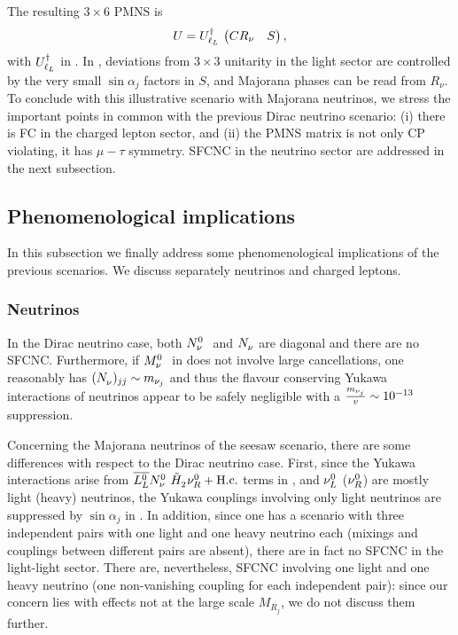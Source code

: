 \documentclass[12pt,a4paper]{article}
\begin{document}
The resulting $3\times 6$ PMNS is
\begin{equation}\label{eq:PMNS:Majorana}
 U=U_{\ell_L}^{\dagger}\,\begin{pmatrix}CR_\nu & S\end{pmatrix},
\end{equation}
with $U_{\ell_L}^{\dagger}$ in . In , deviations from $3\times 3$ unitarity in the light sector are controlled by the very small $\sin\alpha_j$ factors in $S$, and Majorana phases can be read from $R_\nu$. To conclude with this illustrative scenario with Majorana neutrinos, we stress the important points in common with the previous Dirac neutrino scenario: (i) there is FC in the charged lepton sector, and (ii) the PMNS matrix is not only CP violating, it has $\mu-\tau$ symmetry. SFCNC in the neutrino sector are addressed in the next subsection.

\subsection{Phenomenological implications\label{sSEC:Pheno}}
In this subsection we finally address some phenomenological implications of the previous scenarios. We discuss separately neutrinos and charged leptons.

\subsubsection{Neutrinos\label{ssSEC:Neutrinos}}
In the Dirac neutrino case, both $\wNN$ and $\mNN$ are diagonal and there are no SFCNC. Furthermore, if $\wMN$ in  does not involve large cancellations, one reasonably has $(\mNN)_{jj}\sim m_{\nu_j}$ and thus the flavour conserving Yukawa interactions of neutrinos appear to be safely negligible with a $\frac{m_{\nu_j}}{v_{}}\sim 10^{-13}$ suppression.

Concerning the Majorana neutrinos of the seesaw scenario, there are some differences with respect to the Dirac neutrino case. First, since the Yukawa interactions arise from $\wLLb\wNN\HSDC{2}\wNR+\Hc$ terms in , and $\nu_L^0$ ($\nu_R^0$) are mostly light (heavy) neutrinos, the Yukawa couplings involving only light neutrinos are suppressed by $\sin\alpha_j$ in . In addition, since one has a scenario with three independent pairs with one light and one heavy neutrino each (mixings and couplings between different pairs are absent), there are in fact no SFCNC in the light-light sector. There are, nevertheless, SFCNC involving one light and one heavy neutrino (one non-vanishing coupling for each independent pair): since our concern lies with effects not at the large scale $M_{R_j}$, we do not discuss them further.
\end{document}
